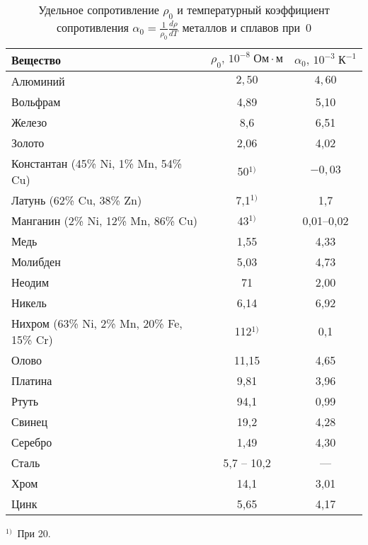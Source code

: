 \begin{table}
\caption{Удельное сопротивление $\rho_0$ и температурный коэффициент сопротивления 
   $\alpha_0 = \frac{1}{\rho_0}\frac{d\rho}{dT}$ металлов и сплавов при~0\oC}
\small
\begin{tabular}{lcc}
\toprule[1pt]
Вещество &
$\rho_0,\,10^{-8}\;Ом\cdot м$ &
$\alpha_0,\,10^{-3}\;К^{-1}$ \\ 
\midrule[1pt]
Алюминий & $2,50$ & $4,60$ \\
Вольфрам & 4,89 & 5,10 \\
Железо & 8,6 & 6,51 \\
Золото & 2,06 & 4,02 \\
Константан (45\% Ni, 1\% Mn, 54\% Cu) & 50$^{1)}$ & $-0,03$ \\
Латунь (62\% Cu, 38\% Zn) & 7,1$^{1)}$ & 1,7 \\
Манганин (2\% Ni, 12\% Mn, 86\% Cu) & 43$^{1)}$ & 0,01--0,02 \\
Медь & 1,55 &4,33 \\
Молибден & 5,03 & 4,73 \\
Неодим & 71 & 2,00 \\
Никель & 6,14 & 6,92 \\
Нихром (63\% Ni, 2\% Mn, 20\% Fe, 15\% Cr) & 112$^{1)}$ & 0,1 \\
Олово & 11,15 & 4,65 \\
Платина & 9,81 & 3,96 \\
Ртуть & 94,1 & 0,99 \\
Свинец & 19,2 & 4,28 \\
Серебро & 1,49 & 4,30 \\
Сталь & 5,7 -- 10,2 & --- \\
Хром & 14,1 & 3,01 \\
Цинк & 5,65 & 4,17 \\ 
\bottomrule[1pt]
\end{tabular}
\par\smallskip
$^{1)}$~При 20\oC.
\end{table}


